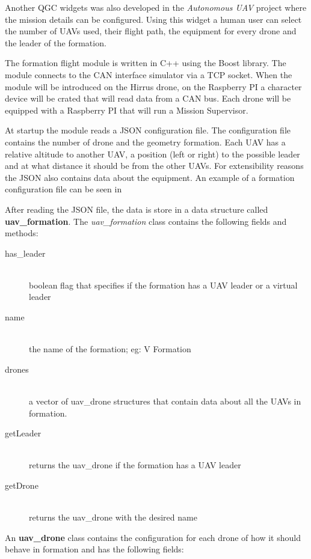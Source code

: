 Another QGC widgets was also developed in the \textit{Autonomous UAV} project
where the mission details can be configured. Using this widget a human user
can select the number of UAVs used, their flight path, the equipment for every
drone and the leader of the formation.

The formation flight module is written in C++ using the Boost library. The 
module connects to the CAN interface simulator via a TCP socket. When the module
will be introduced on the Hirrus drone, on the Raspberry PI a character device
will be crated that will read data from a CAN bus. Each drone will be equipped
with a Raspberry PI that will run a Mission Supervisor.

At startup the module reads a JSON configuration file. The configuration
file contains the number of drone and the geometry formation. Each UAV has
a relative altitude to another UAV, a position (left or right) to the possible 
leader and at what distance it should be from the other UAVs. For extensibility
reasons the JSON also contains data about the equipment. An example of a formation
configuration file can be seen in 

After reading the JSON file, the data is store in a data structure called 
\textbf{uav_formation}. The \textit{uav_formation} class contains the following fields
and methods:

\begin{description}
\item [has_leader] \hfill \\ boolean flag that specifies if the formation has a UAV leader
or a virtual leader
\item [name] \hfill \\ the name of the formation; eg: V Formation
\item [drones] \hfill \\ a vector of uav_drone structures that contain data about all the
UAVs in formation.
\item [getLeader] \hfill \\ returns the uav_drone if the formation has a UAV leader
\item [getDrone] \hfill \\ returns the uav_drone with the desired name
\end{description}

An \textbf{uav_drone} class contains the configuration for each drone of how it
should behave in formation and has the following fields:

